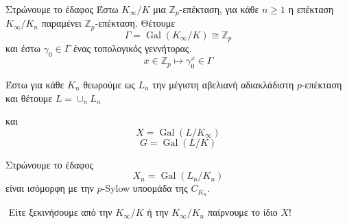 \documentclass{beamer}
\newcommand {\tl}{\textlatin}
\newcommand{\Gal}{\operatorname{Gal}}
\newcommand{\Z}{\mathbb{Z}}
\newcommand{\Lo}{\Lambda_{\mathcal{O}}}
\begin{document}
 



\begin{frame}

\begin{block}{Στρώνουμε το έδαφος}
Έστω $K_\infty/K$ μια $\Z_p$-επέκταση, για κάθε $n \geq 1$ η επέκταση $K_\infty/K_n$ παραμένει $\Z_p$-επέκταση.
Θέτουμε $$\Gamma = \Gal(K_\infty/K) \cong \Z_p$$ και έστω $\gamma_0 \in \Gamma$ ένας τοπολογικός γεννήτορας.
$$x \in \Z_p \longmapsto \gamma_0^x\in \Gamma$$

\pause 

Έστω για κάθε $K_n$ θεωρούμε ως $L_n$ την μέγιστη αβελιανή αδιακλάδιστη $p$-επέκταση και θέτουμε $L= \cup_n L_n$ 
\pause

και
$$X = \Gal(L/K_\infty)$$
$$G = \Gal(L/K)$$

\end{block}
\end{frame}

\begin{frame}
\begin{block}{Στρώνουμε το έδαφος}
$$X_n = \Gal(L_n/K_n) $$
\pause είναι ισόμορφη με την $p$-\tl{Sylow} υποομάδα της $C_{K_n}$.

$ $\newline
Είτε ξεκινήσουμε από την $K_\infty/K$ ή την $K_\infty/K_n$ παίρνουμε το ίδιο $X$!

\end{block}
\end{frame}
\end{document}
